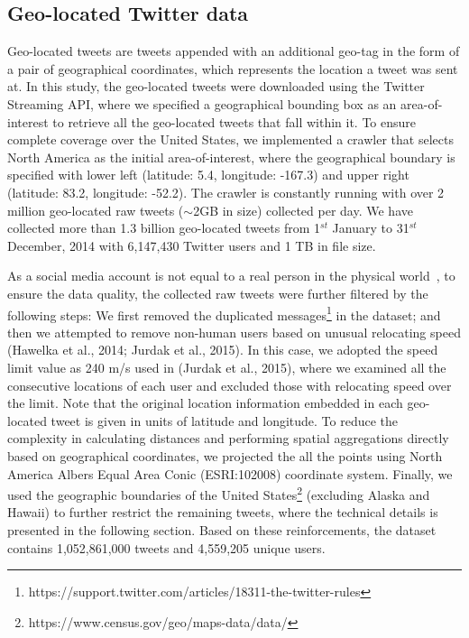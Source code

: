 \documentclass[a4paper, 11pt]{article}
\begin{document}
\subsection{Geo-located Twitter data}
Geo-located tweets are tweets appended with an additional geo-tag in the form of a pair of geographical coordinates, which represents the location a tweet was sent at. 
In this study, the geo-located tweets were downloaded using the Twitter Streaming API, where we specified a geographical bounding box as an area-of-interest to retrieve all the geo-located tweets that fall within it. 
To ensure complete coverage over the United States, we implemented a crawler that selects North America as the initial area-of-interest, where the geographical boundary is specified with lower left (latitude: 5.4, longitude: -167.3) and upper right (latitude: 83.2, longitude: -52.2).
The crawler is constantly running with over 2 million geo-located raw tweets ($\sim$2GB in size) collected per day.
We have collected more than 1.3 billion geo-located tweets from 1$^{st}$ January to 31$^{st}$ December, 2014 with 6,147,430 Twitter users and 1 TB in file size.

As a social media account is not equal to a real person in the physical world~\citep{tsou2015}, to ensure the data quality, the collected raw tweets were further filtered by the following steps: We first removed the duplicated messages\footnote{https://support.twitter.com/articles/18311-the-twitter-rules} in the dataset; and then we attempted to remove non-human users based on unusual relocating speed (Hawelka et al., 2014; Jurdak et al., 2015). 
In this case, we adopted the speed limit value as 240 m/s used in (Jurdak et al., 2015), where we examined all the consecutive locations of each user and excluded those with relocating speed over the limit.
Note that the original location information embedded in each geo-located tweet is given in units of latitude and longitude. To reduce the complexity in calculating distances and performing spatial aggregations directly based on geographical coordinates, we projected the all the points using North America Albers Equal Area Conic (ESRI:102008) coordinate system.
Finally, we used the geographic boundaries of the United States\footnote{https://www.census.gov/geo/maps-data/data/} (excluding Alaska and Hawaii) to further restrict the remaining tweets, where the technical details is presented in the following section. Based on these reinforcements, the dataset contains 1,052,861,000 tweets and 4,559,205 unique users.
\end{document}
